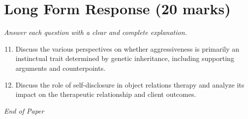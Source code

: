 \documentclass[12pt]{article}
\begin{document}
\section*{Long Form Response (20 marks)}
\textit{Answer each question with a clear and complete explanation.}
\begin{enumerate}[label=\arabic*.]
\setcounter{enumi}{10}
\item Discuss the various perspectives on whether aggressiveness is primarily an instinctual trait determined by genetic inheritance, including supporting arguments and counterpoints.
\item Discuss the role of self-disclosure in object relations therapy and analyze its impact on the therapeutic relationship and client outcomes.
\end{enumerate}

\vfill
\noindent\textit{End of Paper}
\end{document}
